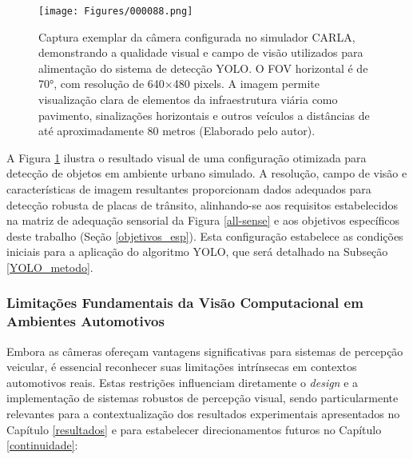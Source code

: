 \begin{figure}[H]
\centering
\texttt{[image: Figures/000088.png]}
\caption{Captura exemplar da câmera configurada no simulador CARLA, demonstrando a qualidade visual e campo de visão utilizados para alimentação do sistema de detecção YOLO. O FOV horizontal é de 70°, com resolução de 640×480 pixels. A imagem permite visualização clara de elementos da infraestrutura viária como pavimento, sinalizações horizontais e outros veículos a distâncias de até aproximadamente 80 metros (Elaborado pelo autor).}
\label{camara_sceneFinal}
\end{figure}

A Figura \ref{camara_sceneFinal} ilustra o resultado visual de uma configuração otimizada para detecção de objetos em ambiente urbano simulado. A resolução, campo de visão e características de imagem resultantes proporcionam dados adequados para detecção robusta de placas de trânsito, alinhando-se aos requisitos estabelecidos na matriz de adequação sensorial da Figura \ref{all-sense} e aos objetivos específicos deste trabalho (Seção \ref{objetivos_esp}). Esta configuração estabelece as condições iniciais para a aplicação do algoritmo YOLO, que será detalhado na Subseção \ref{YOLO_metodo}.

\subsubsection{Limitações Fundamentais da Visão Computacional em Ambientes Automotivos} \label{subsubsec:limitacoes_visao}

Embora as câmeras ofereçam vantagens significativas para sistemas de percepção veicular, é essencial reconhecer suas limitações intrínsecas em contextos automotivos reais. Estas restrições influenciam diretamente o \textit{design} e a implementação de sistemas robustos de percepção visual, sendo particularmente relevantes para a contextualização dos resultados experimentais apresentados no Capítulo \ref{resultados} e para estabelecer direcionamentos futuros no Capítulo \ref{continuidade}:

